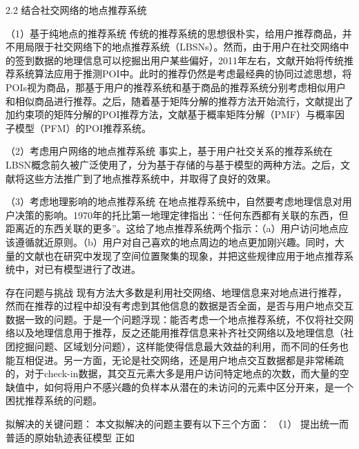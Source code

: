 2.2 结合社交网络的地点推荐系统

（1）基于纯地点的推荐系统
传统的推荐系统的思想很朴实，给用户推荐商品，并不用局限于社交网络下的地点推荐系统（LBSNs）。然而，由于用户在社交网络中的签到数据的地理信息可以挖掘出用户某些偏好，2011年左右，文献\cite{ye2011exploiting,berjani2011recommendation}开始将传统推荐系统算法应用于推测POI中。此时的推荐仍然是考虑最经典的协同过滤思想，将POIs视为商品，那基于用户的推荐系统\cite{breese1998empirical}和基于商品的推荐系统\cite{sarwar2001item,linden2003amazon}分别考虑相似用户和相似商品进行推荐。之后，随着基于矩阵分解的推荐方法开始流行\cite{mnih2008probabilistic,lee2001algorithms,koren2009matrix}，文献\cite{berjani2011recommendation}提出了加约束项的矩阵分解的POI推荐方法，文献\cite{cheng2012fused}基于概率矩阵分解（PMF）与概率因子模型（PFM）的POI推荐系统。

（2）考虑用户网络的地点推荐系统
事实上，基于用户社交关系的推荐系统在LBSN概念前久被广泛使用了，分为基于存储的\cite{golbeck2006generating,massa2007trust,jamali2009trustwalker}与基于模型\cite{jamali2010matrix,ma2008sorec}的两种方法。之后，文献\cite{cheng2012fused,ye2010location}将这些方法推广到了地点推荐系统中，并取得了良好的效果。

（3）考虑地理影响的地点推荐系统
在地点推荐系统中，自然要考虑地理信息对用户决策的影响。1970年的托比第一地理定律指出：“任何东西都有关联的东西，但距离近的东西关联的更多”\cite{tobler1970computer}。这给了地点推荐系统两个指示：（a）用户访问地点应该遵循就近原则。（b）用户对自己喜欢的地点周边的地点更加刚兴趣。同时，大量的文献\cite{gao2012gscorr,liu2013learning,ye2011exploiting,yuan2013time,zhang2015igeorec}也在研究中发现了空间位置聚集的现象，并把这些规律应用于地点推荐系统中，对已有模型进行了改进。



存在问题与挑战
现有方法大多数是利用社交网络、地理信息来对地点进行推荐，然而在推荐的过程中却没有考虑到其他信息的数据是否全面，是否与用户地点交互数据一致的问题。于是一个问题浮现：能否考虑一个地点推荐系统，不仅将社交网络以及地理信息用于推荐，反之还能用推荐信息来补齐社交网络以及地理信息（社团挖掘问题、区域划分问题），这样能使得信息最大效益的利用，而不同的任务也能互相促进。另一方面，无论是社交网络，还是用户地点交互数据都是非常稀疏的，对于check-in数据，其交互元素大多是用户访问特定地点的次数，而大量的空缺值中，如何将用户不感兴趣的负样本从潜在的未访问的元素中区分开来，是一个困扰推荐系统的问题。



拟解决的关键问题：
本文拟解决的问题主要有以下三个方面：
（1） 提出统一而普适的原始轨迹表征模型
 正如

